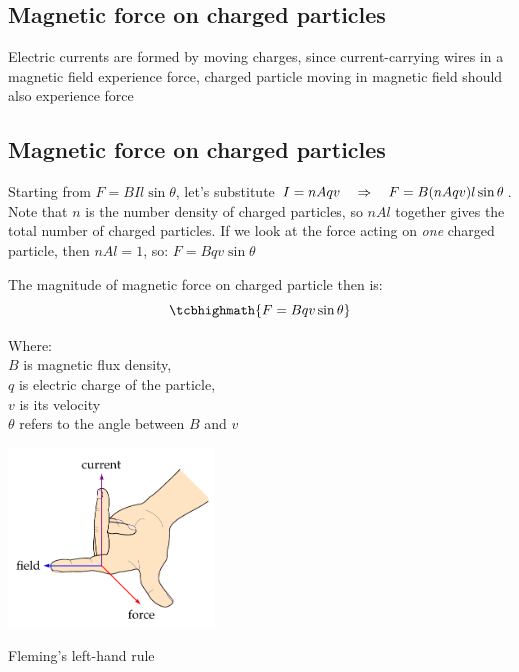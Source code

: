 






\subsection{Magnetic force on charged particles}

Electric currents are formed by moving charges, since current-carrying wires in a magnetic field experience force, charged particle moving in magnetic field should also experience force

\subsection{Magnetic force on charged particles}

Starting from $F=BIl\sin\theta$, let's substitute $I=nAqv \quad \Rightarrow \quad F=B(nAqv)l\sin\theta$. Note that $n$ is the number density of charged particles, so $nAl$ together gives the total number of charged particles. If we look at the force acting on \emph{one} charged particle, then $nAl=1$, so: $F=Bqv\sin\theta$

The magnitude of magnetic force on charged particle then is: $$\tcbhighmath{F=Bqv\sin\theta}$$

Where:\\
$B$ is magnetic flux density, \\
$q$ is electric charge of the particle,\\
$v$ is its velocity\\
$\theta$ refers to the angle between $B$ and $v$\\

\begin{marginfigure}
	\vspace*{-16pt}
	\centering
	\includegraphics[height=135pt]{left-hand.pdf}
	
	Fleming's left-hand rule
	\vspace*{-16pt}
\end{marginfigure}

